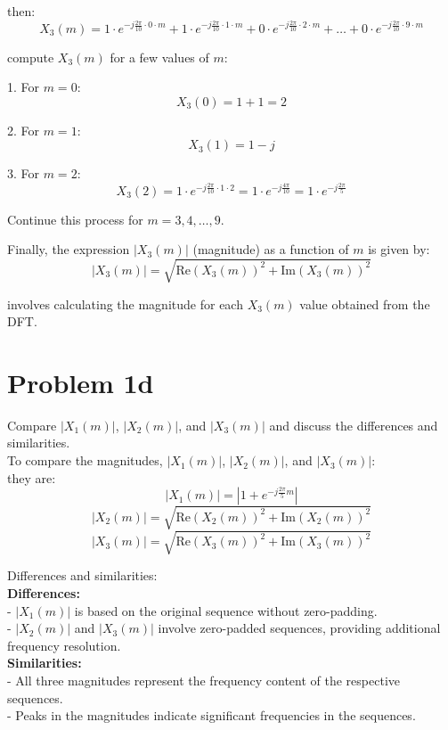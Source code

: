 \documentclass{article}
\begin{document}
then:
\[
X_3(m) = 1 \cdot e^{-j\frac{2\pi}{10} \cdot 0 \cdot m} + 1 \cdot e^{-j\frac{2\pi}{10} \cdot 1 \cdot m} + 0 \cdot e^{-j\frac{2\pi}{10} \cdot 2 \cdot m} + \ldots + 0 \cdot e^{-j\frac{2\pi}{10} \cdot 9 \cdot m}
\]

compute \( X_3(m) \) for a few values of \( m \):

1. For \( m = 0 \):
\[ X_3(0) = 1 + 1 = 2 \]

2. For \( m = 1 \):
\[ X_3(1) = 1 - j \]

3. For \( m = 2 \):
\[ X_3(2) = 1 \cdot e^{-j\frac{2\pi}{10} \cdot 1 \cdot 2} = 1 \cdot e^{-j\frac{4\pi}{10}} = 1 \cdot e^{-j\frac{2\pi}{5}} \]

Continue this process for \( m = 3, 4, \ldots, 9 \).

Finally, the expression \( |X_3(m)| \) (magnitude) as a function of \( m \) is given by:
\[ |X_3(m)| = \sqrt{\text{Re}(X_3(m))^2 + \text{Im}(X_3(m))^2} \]

involves calculating the magnitude for each \( X_3(m) \) value obtained from the DFT.


\section*{Problem 1d}
Compare \( |X_1(m)| \), \( |X_2(m)| \), and \( |X_3(m)| \) and discuss the differences and similarities. \\

To compare the magnitudes, \( |X_1(m)| \), \( |X_2(m)| \), and \( |X_3(m)| \): \\
they are:
\[ |X_1(m)| = |1 + e^{-j\frac{2\pi}{5}m}| \]
\[ |X_2(m)| = \sqrt{\text{Re}(X_2(m))^2 + \text{Im}(X_2(m))^2} \]
\[ |X_3(m)| = \sqrt{\text{Re}(X_3(m))^2 + \text{Im}(X_3(m))^2} \]

Differences and similarities:\\

\textbf{Differences:} \\
- \( |X_1(m)| \) is based on the original sequence without zero-padding.\\
- \( |X_2(m)| \) and \( |X_3(m)| \) involve zero-padded sequences, providing additional frequency resolution.\\

\textbf{Similarities:}\\
- All three magnitudes represent the frequency content of the respective sequences.\\
- Peaks in the magnitudes indicate significant frequencies in the sequences.\\
\end{document}
